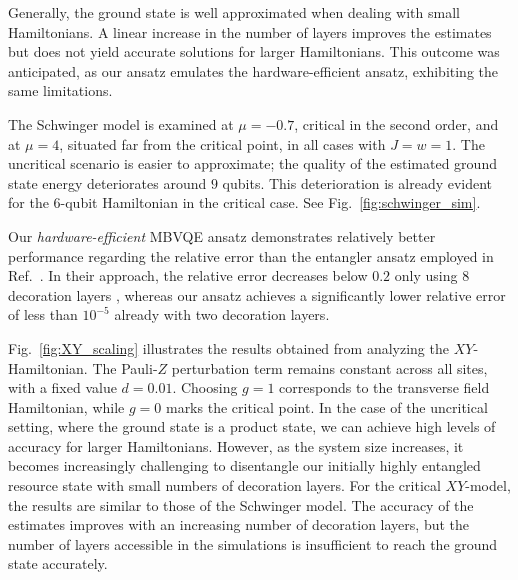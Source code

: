 \documentclass[../main.tex]{subfiles}
\begin{document}
Generally, the ground state is well approximated when dealing with small Hamiltonians. A linear increase in the number of layers improves the estimates but does not yield accurate solutions for larger Hamiltonians. This outcome was anticipated, as our ansatz emulates the hardware-efficient ansatz, exhibiting the same limitations.

The Schwinger model is examined at $\mu = -0.7$, critical in the second order\cite{kokail2019self,byrnes2002density}, and at $\mu = 4$, situated far from the critical point, in all cases with $J = w = 1$. The uncritical scenario is easier to approximate; the quality of the estimated ground state energy deteriorates around $9$ qubits. This deterioration is already evident for the $6$-qubit Hamiltonian in the critical case. See Fig.~\ref{fig:schwinger_sim}.

Our \textit{hardware-efficient} MBVQE ansatz demonstrates relatively better performance regarding the relative error than the entangler ansatz employed in Ref.~\cite{ferguson2021measurement}. In their approach, the relative error decreases below $0.2$ only using 8 decoration layers \cite{ferguson2021measurement}, whereas our ansatz achieves a significantly lower relative error of less than $10^{-5}$ already with two decoration layers.


Fig.~\ref{fig:XY_scaling} illustrates the results obtained from analyzing the $XY$-Hamiltonian. The Pauli-$Z$ perturbation term remains constant across all sites, with a fixed value $d=0.01$. Choosing $g=1$ corresponds to the transverse field Hamiltonian, while $g=0$ marks the critical point. In the case of the uncritical setting, where the ground state is a product state, we can achieve high levels of accuracy for larger Hamiltonians. However, as the system size increases, it becomes increasingly challenging to disentangle our initially highly entangled resource state with small numbers of decoration layers. For the critical $XY$-model, the results are similar to those of the Schwinger model. The accuracy of the estimates improves with an increasing number of decoration layers, but the number of layers accessible in the simulations is insufficient to reach the ground state accurately.
\end{document}
